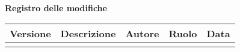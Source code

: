 \newpage
\begin{center}
	\Large{\textbf{Registro delle modifiche}}
	\\\vspace{0.5cm}
	\normalsize
	\begin{tabularx}{\textwidth}{cXccc}
		\textbf{Versione} & \textbf{Descrizione} & \textbf{Autore} & \textbf{Ruolo} & \textbf{Data} \\\toprule
		\modifiche
		\bottomrule
	\end{tabularx}
\end{center}
\newpage
